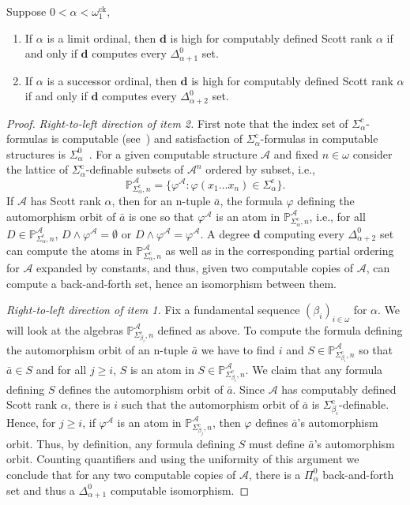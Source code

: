 \documentclass[10pt,a4paper]{amsart}
\newcommand\+[1]{\mathcal{#1}}
\renewcommand\*[1]{\mathbf{#1}}
\renewcommand\=[1]{\text{#1}}
\renewcommand\*[1]{\mathbf{#1}}
\renewcommand{\phi}{\varphi}
\newcommand{\A}{\mathcal{A}}
\newcommand{\Sicom}[1]{\Sigma^{\mathrm{c}}_{#1}}
\newcommand{\ock}{\omega_{1}^{\mathrm{ck}}}
\newcommand{\nat}{\omega}
\begin{document}
 \begin{theorem}\label{thm:highforcompSR}
    Suppose $0 < \alpha < \ock$,
\begin{enumerate}
\item If $\alpha$ is a limit ordinal, then $\*d$ is high for computably defined Scott rank $\alpha$ if and only if $\*d$ computes every $\Delta^0_{\alpha+1}$ set.
\item If $\alpha$ is a successor ordinal, then $\*d$ is high for computably defined Scott rank $\alpha$ if and only if $\*d$ computes every $\Delta^0_{\alpha+2}$ set.
\end{enumerate}
\end{theorem}
\begin{proof}
  \emph{Right-to-left direction of item 2.} First note that the index set of $\Sicom{\alpha}$-formulas is computable (see~\cite[p.~106]{ash2000}) and satisfaction of $\Sicom{\alpha}$-formulas in computable structures is $\Sigma^0_\alpha$~\cite[Theorem 7.5]{ash2000}. For a given computable structure $\+A$ and fixed $n\in\nat$ consider the lattice of $\Sicom{\alpha}$-definable subsets of $\A^n$ ordered by subset, i.e.,
  \[ \mathbb{P}_{\Sicom{\alpha},n}^{{\+A}}=\{ \phi^\+A: \phi(x_1\dots x_n)\in \Sicom{\alpha}\}.\]
  If $\+A$ has Scott rank $\alpha$, then for an n-tuple $\bar a$, the formula $\phi$ defining the automorphism orbit of $\bar a$ is one so that $\phi^{\+A}$ is an atom in $\mathbb{P}_{\Sicom\alpha,n}^{\+A}$, i.e., for all $D\in \mathbb{P}_{\Sicom\alpha,n}^{\+A}$, $D\land \phi^{\+A}=\emptyset$ or $D\land \phi^{\+A}=\phi^{\+A}$. A degree $\*d$ computing every $\Delta^0_{\alpha+2}$ set can compute the atoms in $\mathbb{P}_{\Sicom\alpha,n}^{\+A}$ as well as in the corresponding partial ordering for $\+A$ expanded by constants, and thus, given two computable copies of $\+A$, can compute a back-and-forth set, hence an isomorphism between them.

  \emph{Right-to-left direction of item 1.} Fix a fundamental sequence $(\beta_i)_{i\in\nat}$ for $\alpha$. We will look at the algebras $\mathbb P_{\Sicom{\beta_i},n}^{{\+A}}$ defined as above. To compute the formula defining the automorphism orbit of an n-tuple $\bar a$ we have to find $i$ and $S\in\mathbb P_{\Sicom{\beta_i},n}^{{\+A}}$ so that $\bar a\in S$ and for all $j\geq i$, $S$ is an atom in $S\in\mathbb P_{\Sicom{\beta_i},n}^{{\+A}}$. We claim that any formula defining $S$ defines the automorphism orbit of $\bar a$. Since $\+A$ has computably defined Scott rank $\alpha$, there is $i$ such that the automorphism orbit of $\bar a$ is $\Sicom{\beta_i}$-definable. Hence, for $j\geq i$, if $\phi^{\+A}$ is an atom in $\mathbb P_{\Sicom{\beta_j},n}^{{\+A}}$, then $\phi$ defines $\bar a$'s automorphism orbit. Thus, by definition, any formula defining $S$ must define $\bar a$'s automorphism orbit. Counting quantifiers and using the uniformity of this argument we conclude that for any two computable copies of $\+A$, there is a $\Pi^0_\alpha$ back-and-forth set and thus a $\Delta^0_{\alpha+1}$ computable isomorphism.


\end{proof}
\end{document}
